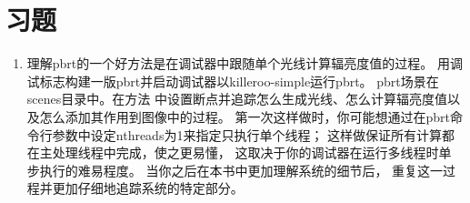 \section{习题}\label{sec:习题01}

\begin{enumerate}
    \item \circleone 理解pbrt的一个好方法是在调试器中跟随单个光线计算辐亮度值的过程。
          用调试标志构建一版pbrt并启动调试器以{\ttfamily  killeroo-simple}运行pbrt。
          pbrt场景在{\ttfamily scenes}目录中。在方法
          中设置断点并追踪怎么生成光线、怎么计算辐亮度值以及怎么添加其作用到图像中的过程。
          第一次这样做时，你可能想通过在pbrt命令行参数中设定{\ttfamily nthreads}为1来指定只执行单个线程；
          这样做保证所有计算都在主处理线程中完成，使之更易懂，
          这取决于你的调试器在运行多线程时单步执行的难易程度。
          当你之后在本书中更加理解系统的细节后，
          重复这一过程并更加仔细地追踪系统的特定部分。
\end{enumerate}